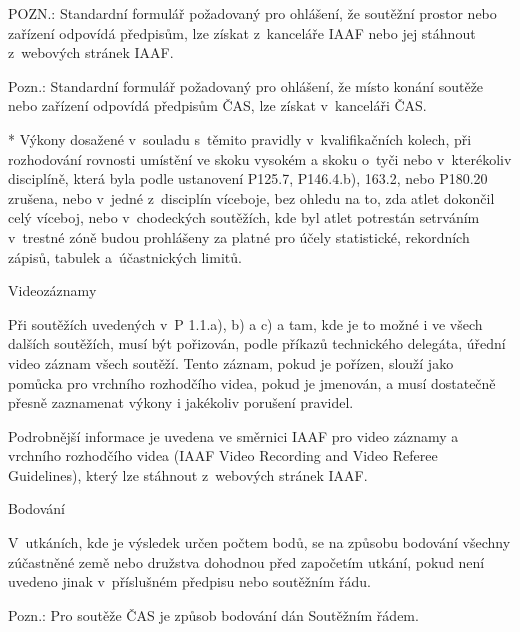   POZN.: Standardní formulář požadovaný pro ohlášení, že soutěžní prostor nebo zařízení odpovídá předpisům, lze získat z~kanceláře IAAF nebo jej stáhnout z~webových stránek IAAF.

  Pozn.: Standardní formulář požadovaný pro ohlášení, že místo konání soutěže nebo zařízení odpovídá předpisům ČAS, lze získat v~kanceláři ČAS.
  \enditems

* Výkony dosažené v~souladu s~těmito pravidly v~kvalifikačních kolech, při rozhodování rovnosti umístění ve skoku vysokém a skoku o~tyči nebo v~kterékoliv disciplíně, která byla podle ustanovení P125.7, P146.4.b), 163.2, nebo P180.20 zrušena, nebo v~jedné z~disciplín víceboje, bez ohledu na to, zda atlet dokončil celý víceboj, nebo v~chodeckých soutěžích, kde byl atlet potrestán setrváním v~trestné zóně budou prohlášeny za platné pro účely statistické, rekordních zápisů, tabulek a~účastnických limitů.
\enditems

\secc Videozáznamy

Při soutěžích uvedených v~P 1.1.a), b) a c) a tam, kde je to možné i ve všech dalších soutěžích, musí být pořizován, podle příkazů technického delegáta, úřední video záznam všech soutěží. Tento záznam, pokud je pořízen, slouží jako pomůcka pro vrchního rozhodčího videa, pokud je jmenován, a musí dostatečně přesně zaznamenat výkony i jakékoliv porušení pravidel.

Podrobnější informace je uvedena ve směrnici IAAF pro video záznamy a vrchního rozhodčího videa (IAAF Video Recording and Video Referee Guidelines), který lze stáhnout z~webových stránek IAAF.

\secc Bodování

V~utkáních, kde je výsledek určen počtem bodů, se na způsobu bodování všechny zúčastněné země nebo družstva dohodnou před započetím utkání, pokud není uvedeno jinak v~příslušném předpisu nebo soutěžním řádu.

Pozn.: Pro soutěže ČAS je způsob bodování dán Soutěžním řádem.

\endinput